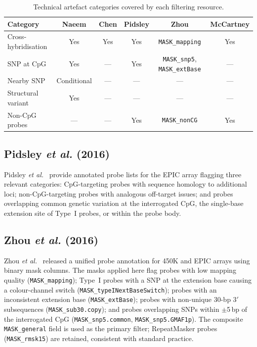 \begin{table}[t]
\centering
\caption{Technical artefact categories covered by each filtering resource.}
\label{tab:filter_categories}
\scriptsize
\begin{tabular}{l c c c c c}
\toprule
\textbf{Category} &
\textbf{Naeem} &
\textbf{Chen} &
\textbf{Pidsley} &
\textbf{Zhou} &
\textbf{McCartney} \\
\midrule
Cross-hybridisation &
Yes & Yes & Yes & \texttt{MASK\_mapping} & Yes \\
SNP at CpG &
Yes & --- & Yes & \texttt{MASK\_snp5}, \texttt{MASK\_extBase} & --- \\
Nearby SNP &
Conditional & --- & --- & --- & --- \\
Structural variant &
Yes & --- & --- & --- & --- \\
Non-CpG probes &
--- & --- & Yes & \texttt{MASK\_nonCG} & Yes \\
\bottomrule
\end{tabular}
\end{table}

\subsection{Pidsley \textit{et al.} (2016)}
\label{app:pidsley2016}

Pidsley \textit{et al.}~\cite{pidsley2016} provide annotated probe lists for
the EPIC array flagging three relevant categories: CpG-targeting probes with
sequence homology to additional loci; non-CpG-targeting probes with analogous
off-target issues; and probes overlapping common genetic variation at the
interrogated CpG, the single-base extension site of Type~I probes, or within
the probe body.

\subsection{Zhou \textit{et al.} (2016)}
\label{app:zhou2016}

Zhou \textit{et al.}~\cite{zhou2017} released a unified probe annotation for
450K and EPIC arrays using binary mask columns. The masks applied here flag
probes with low mapping quality (\texttt{MASK\_mapping}); Type~I probes with
a SNP at the extension base causing a colour-channel switch
(\texttt{MASK\_typeINextBaseSwitch}); probes with an inconsistent extension base
(\texttt{MASK\_extBase}); probes with non-unique 30-bp 3$'$ subsequences
(\texttt{MASK\_sub30.copy}); and probes overlapping SNPs within $\pm$5\,bp of
the interrogated CpG (\texttt{MASK\_snp5.common}, \texttt{MASK\_snp5.GMAF1p}).
The composite \texttt{MASK\_general} field is used as the primary filter;
RepeatMasker probes (\texttt{MASK\_rmsk15}) are retained, consistent with
standard practice.

